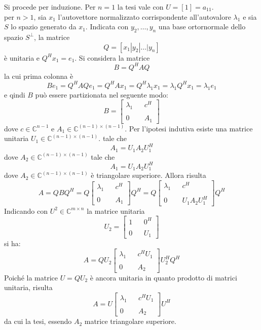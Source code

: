 \begin{thproof}
Si procede per induzione. Per $n=1$ la tesi vale con $U = [1]= a_{11}$. \\
 per $n>1$, sia $x_1$ l'autovettore normalizzato
corrispondente all'autovalore $\lambda_1$ e sia $S$ lo spazio
generato da $x_1$. Indicata con $y_2, \ldots, y_n$ una base
ortornormale dello spazio $S^{\bot}$, la matrice
$$ Q = [ x_1 | y_2 | \ldots | y_n ] $$
\`e unitaria e $Q^{H}x_1 = e_1$. Si considera la matrice
$$ B = Q^{H}AQ$$
la cui prima colonna \`e
$$ Be_1 = Q^{H}AQe_1 = Q^{H}Ax_1 = Q^{H}\lambda_1 x_1 = 
\lambda_1 Q^{H}x_1 = \lambda_1 e_1$$
e qindi $B$ può essere partizionata nel seguente modo:
$$
B =
\left[
\begin{array}{ccc}
\lambda_1 & & c^{H}  \\
& & \\
0 & & A_1 
\end{array}
\right]
$$
dove $c \in \mathbb{C}^{n-1}$ e $A_1 \in \mathbb{C}^{(n-1)\times (n-1)}$.
Per l'ipotesi indutiva esiste una
 matrice unitaria $U_1 \in \mathbb{C}^{(n-1)\times (n-1)}$. tale che
$$ A_1 = U_1 A_2 U_1^{H} $$
dove $A_2 \in \mathbb{C}^{(n-1) \times (n-1)}$ tale che
$$ A_1 = U_1 A_2 U_{1}^{H} $$
dove $A_2 \in \mathbb{C}^{(n-1)\times (n-1)}$ \`e triangolare superiore.
Allora risulta
$$ A = QBQ^{H} = Q
\left[
\begin{array}{ccc}
\lambda_1 & & c^{H}  \\
& & \\
0 & & A_1 
\end{array}
\right]
Q^{H} =
 Q 
\left[
\begin{array}{ccc}
\lambda_1 & & c^{H}  \\
& & \\
0 & & U_1A_2U_1^{H} 
\end{array}
\right]
Q^{H}
$$
Indicando con $U^{2} \in \mathbb{C}^{m \times n}$ la matrice unitaria
$$ U_2 =
\left[
\begin{array}{ccc}
1 & & 0^{H}  \\
& & \\
0 & & U_1 
\end{array}
\right]
$$
si ha:
$$ A = QU_2
\left[
\begin{array}{ccc}
\lambda_1 & & c^{H}U_1  \\
& & \\
0 & & A_2 
\end{array}
\right]
U_2^{H}Q^{H}
$$
Poich\'e la matrice $U=QU_2$ \`e ancora unitaria in quanto 
prodotto di matrici unitaria, risulta
$$ A = U
\left[
\begin{array}{ccc}
\lambda_1 & & c^{H}U_1  \\
& & \\
0 & & A_2 
\end{array}
\right]
U^{H}
$$
da cui la tesi, essendo $A_2$ matrice triangolare superiore.
\end{thproof}


